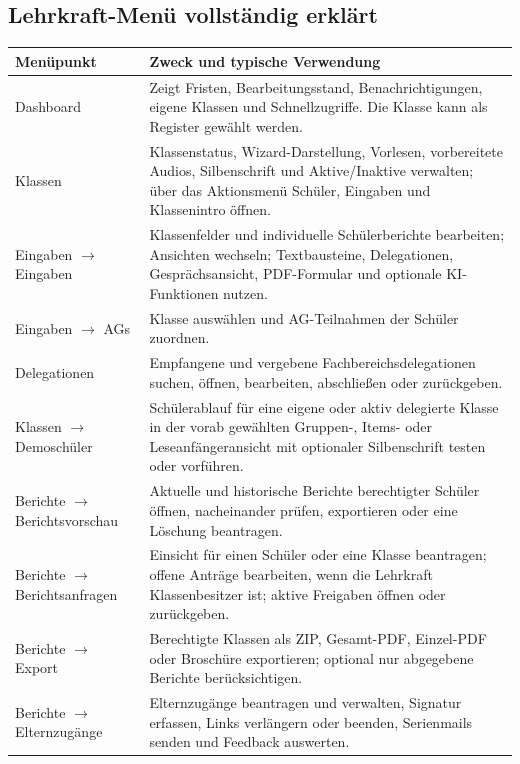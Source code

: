 \documentclass[12pt,a4paper]{article}
\begin{document}
\subsection{Lehrkraft-Menü vollständig erklärt}\label{sec:lehrkraft-menu}
\small
\begin{longtable}{|p{}|p{}|}
\hline
\textbf{Menüpunkt} & \textbf{Zweck und typische Verwendung}\\
\hline
Dashboard & Zeigt Fristen, Bearbeitungsstand, Benachrichtigungen, eigene Klassen und Schnellzugriffe. Die Klasse kann als Register gewählt werden.\\
\hline
Klassen & Klassenstatus, Wizard-Darstellung, Vorlesen, vorbereitete Audios, Silbenschrift und Aktive/Inaktive verwalten; über das Aktionsmenü Schüler, Eingaben und Klassenintro öffnen.\\
\hline
Eingaben \(\rightarrow\) Eingaben & Klassenfelder und individuelle Schülerberichte bearbeiten; Ansichten wechseln; Textbausteine, Delegationen, Gesprächsansicht, PDF-Formular und optionale KI-Funktionen nutzen.\\
\hline
Eingaben \(\rightarrow\) AGs & Klasse auswählen und AG-Teilnahmen der Schüler zuordnen.\\
\hline
Delegationen & Empfangene und vergebene Fachbereichsdelegationen suchen, öffnen, bearbeiten, abschließen oder zurückgeben.\\
\hline
Klassen \(\rightarrow\) Demoschüler & Schülerablauf für eine eigene oder aktiv delegierte Klasse in der vorab gewählten Gruppen-, Items- oder Leseanfängeransicht mit optionaler Silbenschrift testen oder vorführen.\\
\hline
Berichte \(\rightarrow\) Berichtsvorschau & Aktuelle und historische Berichte berechtigter Schüler öffnen, nacheinander prüfen, exportieren oder eine Löschung beantragen.\\
\hline
Berichte \(\rightarrow\) Berichtsanfragen & Einsicht für einen Schüler oder eine Klasse beantragen; offene Anträge bearbeiten, wenn die Lehrkraft Klassenbesitzer ist; aktive Freigaben öffnen oder zurückgeben.\\
\hline
Berichte \(\rightarrow\) Export & Berechtigte Klassen als ZIP, Gesamt-PDF, Einzel-PDF oder Broschüre exportieren; optional nur abgegebene Berichte berücksichtigen.\\
\hline
Berichte \(\rightarrow\) Elternzugänge & Elternzugänge beantragen und verwalten, Signatur erfassen, Links verlängern oder beenden, Serienmails senden und Feedback auswerten.\\

\end{longtable}
\end{document}
